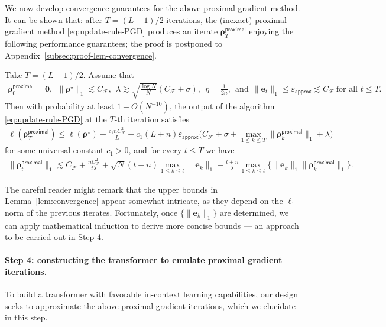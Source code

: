 \documentclass[english]{article}
\begin{document}
We now develop convergence guarantees for the above proximal gradient method. 
It can be shown that: 
after $T=(L-1)/2$ iterations, the (inexact) proximal gradient method \eqref{eq:update-rule-PGD} produces an iterate ${{\bm \rho}}_{T}^{\mathsf{proximal}}$ enjoying the following performance guarantees; the proof is postponed to Appendix~\ref{subsec:proof-lem-convergence}.
%
\begin{lemma} \label{lem:convergence}
%
Take $T=(L-1)/2$. 
Assume that 
%
\begin{align}
{\bm \rho}_0^{\mathsf{proximal}} = {\bm 0}, 
~~ 
\|{\bm \rho}^{\star}\|_1\lesssim C_{\mathcal{F}},~~
\lambda\gtrsim \sqrt{\frac{\log N}{N}}(C_{\mathcal{F}} + \sigma),~~ 
\eta = \frac{1}{2n},~~  
\text{and} ~~\|{\bm e}_t\|_1 \le \varepsilon_{\mathsf{approx}}\lesssim C_{\mathcal{F}} ~\text{for all }t \le T.
\end{align}
%
Then with probability at least $1-O(N^{-10})$, the output of the algorithm  \eqref{eq:update-rule-PGD} at the $T$-th iteration satisfies
%
\begin{align} \label{eq:convergence-rho}
\ell({\bm \rho}_T^{\mathsf{proximal}}) \le \ell({\bm \rho}^{\star}) + \frac{c_1nC_{\mathcal{F}}^2}{L} + c_1(L+n)\varepsilon_{\mathsf{approx}}\bigg(C_{\mathcal{F}} + \sigma + \max_{1\le k\le T}\|{\bm \rho}_{k}^{\mathsf{proximal}}\|_1 + \lambda\bigg)
\end{align}
for some universal constant  $c_1>0$, and for every $t \le T$ we have
%
\begin{align}\label{eq:lem-convergence-bound-rho}
\|{\bm \rho}_t^{\mathsf{proximal}}\|_1 \lesssim
C_{\mathcal{F}}  + \frac{nC_{\mathcal{F}}^2}{t\lambda} + \sqrt{N}(t+n)\max_{1\le k\le t}\|{\bm e}_{k}\|_1 + \frac{t+n}{\lambda}\max_{1\le k\le t}\big\{\|{\bm e}_k\|_1\|{\bm \rho}_k^{\mathsf{proximal}}\|_1\big\}.
\end{align}
\end{lemma}
%
\begin{remark}
The careful reader might remark that the upper bounds in Lemma~\ref{lem:convergence} appear somewhat intricate, as they depend on the $\ell_1$ norm of the previous iterates. Fortunately, once $\{\|\bm{e}_k\|_1\}$ are determined, we can apply mathematical induction to derive more concise bounds --- an approach to be carried out in Step 4. 
\end{remark}

\paragraph{Step 4: constructing the transformer  to emulate proximal gradient iterations.}
%
To build a transformer with favorable in-context learning capabilities, our design seeks to approximate the above proximal gradient iterations, which we elucidate in this step. 
\end{document}
